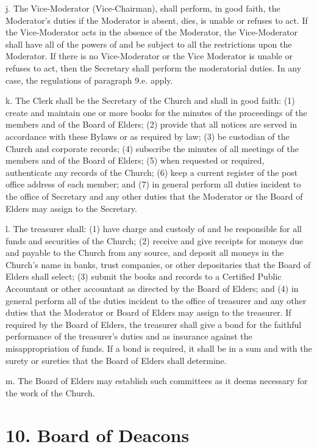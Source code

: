 \documentclass[
]{book}
\begin{document}
j. The Vice-Moderator (Vice-Chairman), shall perform, in good faith, the Moderator's duties if the Moderator is absent, dies, is unable or refuses to act. If the Vice-Moderator acts in the absence of the Moderator, the Vice-Moderator shall have all of the powers of and be subject to all the restrictions upon the Moderator. If there is no Vice-Moderator or the Vice Moderator is unable or refuses to act, then the Secretary shall perform the moderatorial duties. In any case, the regulations of paragraph 9.e. apply.

k. The Clerk shall be the Secretary of the Church and shall in good faith: (1) create and maintain one or more books for the minutes of the proceedings of the members and of the Board of Elders; (2) provide that all notices are served in accordance with these Bylaws or as required by law; (3) be custodian of the Church and corporate records; (4) subscribe the minutes of all meetings of the members and of the Board of Elders; (5) when requested or required, authenticate any records of the Church; (6) keep a current register of the post office address of each member; and (7) in general perform all duties incident to the office of Secretary and any other duties that the Moderator or the Board of Elders may assign to the Secretary.

l. The treasurer shall: (1) have charge and custody of and be responsible for all funds and securities of the Church; (2) receive and give receipts for moneys due and payable to the Church from any source, and deposit all moneys in the Church's name in banks, trust companies, or other deposit­ar­­ies that the Board of Elders shall select; (3) submit the books and records to a Certified Public Accoun­tant or other accountant as directed by the Board of Elders; and (4) in general perform all of the duties inci­dent to the office of treasurer and any other duties that the Moderator or Board of Elders may assign to the treasurer. If required by the Board of Elders, the treasurer shall give a bond for the faithful perfor­mance of the treasurer's duties and as insurance against the misappropriation of funds. If a bond is required, it shall be in a sum and with the surety or sureties that the Board of Elders shall determine.

m. The Board of Elders may establish such committees as it deems necessary for the work of the Church.

\hypertarget{board-of-deacons}{%
\section{10. Board of Deacons}\label{board-of-deacons}}
\end{document}

